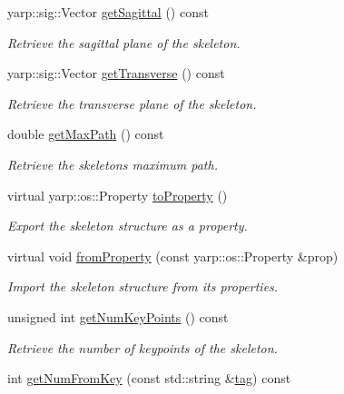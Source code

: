 \begin{DoxyCompactItemize}
yarp\+::sig\+::\+Vector \mbox{\hyperlink{classassistive__rehab_1_1Skeleton_a83133fabc903ddd4e54edf59df977167}{get\+Sagittal}} () const
\begin{DoxyCompactList}\small\item\em Retrieve the sagittal plane of the skeleton. \end{DoxyCompactList}\item 
yarp\+::sig\+::\+Vector \mbox{\hyperlink{classassistive__rehab_1_1Skeleton_a35c3cdea575eb474a2cb8e0186011cff}{get\+Transverse}} () const
\begin{DoxyCompactList}\small\item\em Retrieve the transverse plane of the skeleton. \end{DoxyCompactList}\item 
double \mbox{\hyperlink{classassistive__rehab_1_1Skeleton_acda9030cd2ed3ad92697418a5e2cff7c}{get\+Max\+Path}} () const
\begin{DoxyCompactList}\small\item\em Retrieve the skeleton\textquotesingle{}s maximum path. \end{DoxyCompactList}\item 
virtual yarp\+::os\+::\+Property \mbox{\hyperlink{classassistive__rehab_1_1Skeleton_ad58ea53a165abc3f39a3c46594f0560f}{to\+Property}} ()
\begin{DoxyCompactList}\small\item\em Export the skeleton structure as a property. \end{DoxyCompactList}\item 
virtual void \mbox{\hyperlink{classassistive__rehab_1_1Skeleton_ac844f66503de87859833056dc33a835b}{from\+Property}} (const yarp\+::os\+::\+Property \&prop)
\begin{DoxyCompactList}\small\item\em Import the skeleton structure from its properties. \end{DoxyCompactList}\item 
unsigned int \mbox{\hyperlink{classassistive__rehab_1_1Skeleton_ac5e5b98f2c9178f6e0def5033e27922f}{get\+Num\+Key\+Points}} () const
\begin{DoxyCompactList}\small\item\em Retrieve the number of keypoints of the skeleton. \end{DoxyCompactList}\item 
int \mbox{\hyperlink{classassistive__rehab_1_1Skeleton_a954bfa99e0dad997ca6d93495246d3f1}{get\+Num\+From\+Key}} (const std\+::string \&\mbox{\hyperlink{classassistive__rehab_1_1Skeleton_a3d1ce5280300e012826948dc4383c2cb}{tag}}) const

\end{DoxyCompactItemize}
